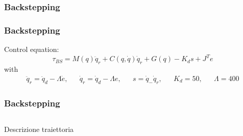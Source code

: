 \subsubsection{Backstepping}
\begin{frame}
\frametitle{Backstepping}
Control equation:
\begin{equation}
	\tau_{BS} = M(q)\ddot{q}_r + C(q,\dot{q})\dot{q}_r + G(q) - K_ds + J^Te
\end{equation}
with
\begin{align*}
\ddot{q}_r=\ddot{q}_d - \Lambda\dot{e}, && \dot{q}_r=\dot{q}_d - \Lambda e, && s=\dot{q}_ - \dot{q}_r, && K_d=50, && \Lambda=400
\end{align*}
\end{frame}
%
\begin{frame}
\frametitle{Backstepping}
%
\begin{columns}
\begin{column}{0.5\textwidth}
	Descrizione traiettoria
\end{column}
\begin{column}{0.5\textwidth}
	\begin{figure}
	\end{figure}
\end{column}
\end{columns}
\end{frame}
%

